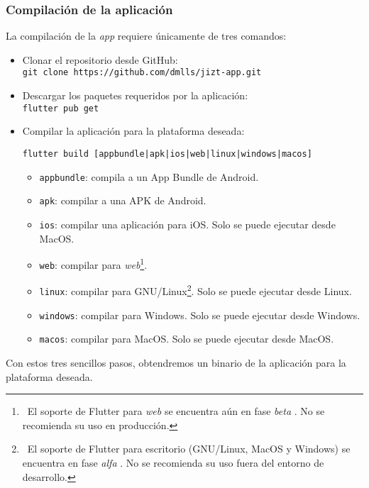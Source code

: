 \subsubsection{Compilación de la aplicación}

La compilación de la \emph{app} requiere únicamente de tres comandos:

\vspace{-0.2cm}
\begin{itemize} [\textbullet]
	\item Clonar el repositorio desde GitHub: \\
	\texttt{git clone https://github.com/dmlls/jizt-app.git}
	
	\item Descargar los paquetes requeridos por la aplicación: \\
	\texttt{flutter pub get}
	
	\item Compilar la aplicación para la plataforma deseada:
	
	\texttt{flutter build [appbundle|apk|ios|web|linux|windows|macos]}
	
	\begin{itemize} [◦]
		\item \texttt{appbundle}: compila a un App Bundle de Android.
		\item \texttt{apk}: compilar a una APK de Android.
		\item \texttt{ios}: compilar una aplicación para iOS. Solo se puede ejecutar desde MacOS.
		\item \texttt{web}: compilar para \emph{web}\footnote{\, El soporte de Flutter para \emph{web} se encuentra aún en fase \emph{beta} \cite{flutter-web}. No se recomienda su uso en producción.}.
		\item \texttt{linux}: compilar para GNU/Linux\footnote{\, El soporte de Flutter para escritorio (GNU/Linux, MacOS y Windows) se encuentra en fase \emph{alfa} \cite{flutter-desktop}. No se recomienda su uso fuera del entorno de desarrollo.}. Solo se puede ejecutar desde Linux.
		\item \texttt{windows}: compilar para Windows. Solo se puede ejecutar desde Windows.
		\item \texttt{macos}: compilar para MacOS. Solo se puede ejecutar desde MacOS.
	\end{itemize}
\end{itemize}

Con estos tres sencillos pasos, obtendremos un binario de la aplicación para la plataforma deseada.




